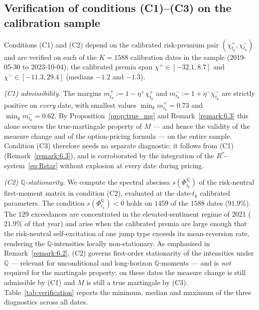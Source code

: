 \documentclass[11pt,a4paper]{article}
\numberwithin{equation}{section}
\theoremstyle{remark}
\theoremstyle{definition}
\newcommand{\q}{{\mathbb Q}}
\begin{document}
  {
\subsection{Verification of conditions (C1)--(C3) on the calibration sample}
\label{sec:verif}

Conditions (C1) and (C2) depend on the calibrated risk-premium pair
$(\chi^{+}_{t_k},\chi^{-}_{t_k})$ and are verified on each of the $K=1588$ calibration dates in the
sample (2019-05-30 to 2023-10-04); the calibrated premia span $\chi^{+}\in[-32.1,8.7]$ and
$\chi^{-}\in[-11.3,29.4]$ (medians $-1.2$ and $-1.3$).

\emph{(C1) admissibility.} The margins $m^{+}_{t_k}:=1-\eta^{+}\chi^{+}_{t_k}$ and
$m^{-}_{t_k}:=1+\eta^{-}\chi^{-}_{t_k}$ are strictly positive on \emph{every} date, with smallest
values $\min_k m^{+}_{t_k}=0.73$ and $\min_k m^{-}_{t_k}=0.62$. By
Proposition~\ref{prop:true_mg} and Remark~\ref{remark:6.3} this alone secures the true-martingale property of
$M$ --- and hence the validity of the measure change and of the option-pricing formula --- on the
entire sample.
Condition (C3) therefore needs no separate diagnostic: it follows from (C1)
(Remark~\ref{remark:6.3}), and is corroborated by the integration of the $R^{*}$-system~\eqref{eq:Rstar} without
explosion at every date during pricing.

\emph{(C2) $\q$-stationarity.} We compute the spectral abscissa $s(\Phi^{\q}_{t_k})$ of the risk-neutral first-moment matrix in condition (C2), evaluated at the date-$t_k$ calibrated parameters. The
condition $s(\Phi^{\q}_{t_k})<0$ holds on $1459$ of the $1588$ dates ($91.9\%$). The $129$
exceedances are concentrated in the elevated-sentiment regime of 2021 ($21.9\%$ of that year) and
arise when the calibrated premia are large enough that the risk-neutral self-excitation of one jump
type exceeds its mean-reversion rate, rendering the $\q$-intensities locally non-stationary. As
emphasised in Remark~\ref{remark:6.2}, (C2) governs first-order stationarity of the intensities under $\q$ ---
relevant for unconditional and long-horizon $\q$-moments --- and is \emph{not} required for the
martingale property: on these dates the measure change is still admissible by (C1) and $M$ is still a
true martingale by (C3). Table~\ref{tab:verification} reports the minimum, median and maximum of the three
diagnostics across all dates.

}
\end{document}
